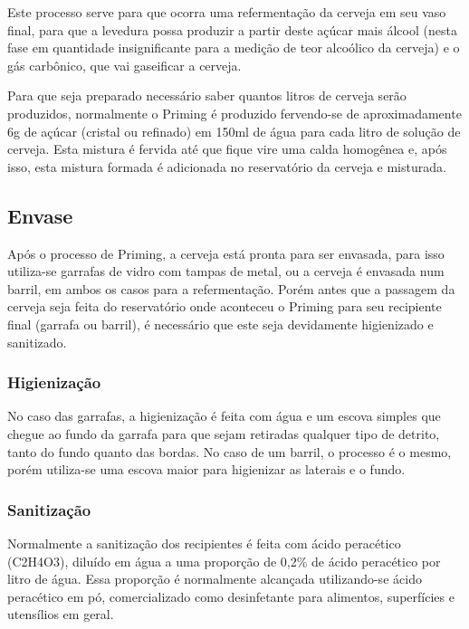 Este processo serve para que ocorra uma refermentação da cerveja em seu vaso final, para que a levedura possa produzir a partir deste açúcar mais álcool (nesta fase em quantidade insignificante para a medição de teor alcoólico da cerveja) e o gás carbônico, que vai gaseificar a cerveja.

Para que seja preparado necessário saber quantos litros de cerveja serão produzidos, normalmente o Priming é produzido fervendo-se de aproximadamente 6g de açúcar (cristal ou refinado) em 150ml de água para cada litro de solução de cerveja. Esta mistura é fervida até que fique vire uma calda homogênea e, após isso, esta mistura formada é adicionada no reservatório da cerveja e misturada.

\subsection{Envase}

Após o processo de Priming, a cerveja está pronta para ser envasada, para isso utiliza-se garrafas de vidro com tampas de metal, ou a cerveja é envasada num barril, em ambos os casos para a refermentação. Porém antes que a passagem da cerveja seja feita do reservatório onde aconteceu o Priming para seu recipiente final (garrafa ou barril), é necessário que este seja devidamente higienizado e sanitizado.

\subsubsection{Higienização}

No caso das garrafas, a higienização é feita com água e um escova simples que chegue ao fundo da garrafa para que sejam retiradas qualquer tipo de detrito, tanto do fundo quanto das bordas. No caso de um barril, o processo é o mesmo, porém utiliza-se uma escova maior para higienizar as laterais e o fundo.

\subsubsection{Sanitização}

Normalmente a sanitização dos recipientes é feita com ácido peracético (C2H4O3), diluído em água a uma proporção de 0,2\% de ácido peracético por litro de água. Essa proporção é normalmente alcançada utilizando-se ácido peracético em pó, comercializado como desinfetante para alimentos, superfícies e utensílios em geral.

